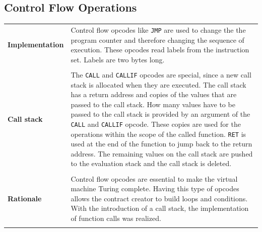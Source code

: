 \subsection{Control Flow Operations}
\begin{tabular}[t]{ p{3cm} p{12.5cm}}
\raggedright
\textbf{Implementation} & 
Control flow opcodes like \texttt{JMP} are used to change the  the program counter and therefore changing the sequence of execution. These opcodes read labels from the instruction set. Labels are two bytes long. \\ \\

\textbf{Call stack} & 
The \texttt{CALL} and \texttt{CALLIF} opcodes are special, since a new call stack is allocated when they are executed. The call stack has a return address and copies of the values that are passed to the call stack. How many values have to be passed to the call stack is provided by an argument of the \texttt{CALL} and \texttt{CALLIF} opcode. These copies are used for the operations within the scope of the called function. \texttt{RET} is used at the end of the function to jump back to the return address. The remaining values on the call stack are pushed to the evaluation stack and the call stack is deleted. \\ \\

\raggedright
\textbf{Rationale} & 
Control flow opcodes are essential to make the virtual machine Turing complete. Having this type of opcodes allows the contract creator to build loops and conditions. With the introduction of a call stack, the implementation of function calls was realized. \\ \\

\end{tabular}

